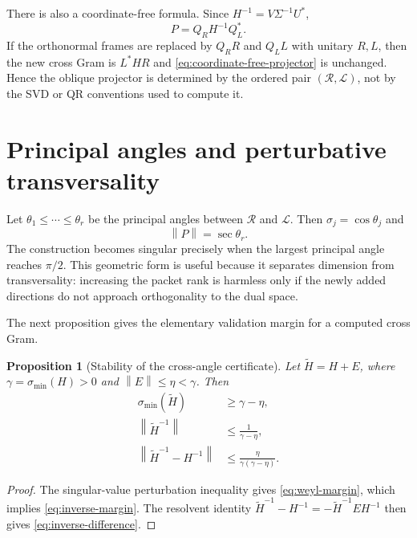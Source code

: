 \documentclass[12pt]{article}
\newtheorem{proposition}[theorem]{Proposition}
\theoremstyle{remark}
\newcommand{\cR}{\mathcal R}
\newcommand{\cL}{\mathcal L}
\newcommand{\norm}[1]{\left\lVert#1\right\rVert}
\begin{document}
There is also a coordinate-free formula.  Since
$H^{-1}=V\Sigma^{-1}U^*$,
\begin{equation}\label{eq:coordinate-free-projector}
 P=Q_RH^{-1}Q_L^*.
\end{equation}
If the orthonormal frames are replaced by
$Q_RR$ and $Q_LL$ with unitary $R,L$, then the new cross Gram is
$L^*HR$ and \eqref{eq:coordinate-free-projector} is unchanged.  Hence the
oblique projector is determined by the ordered pair $(\cR,\cL)$, not by the
SVD or QR conventions used to compute it.

\section{Principal angles and perturbative transversality}

Let $\theta_1\le\cdots\le\theta_r$ be the principal angles between
$\cR$ and $\cL$.  Then $\sigma_j=\cos\theta_j$ and
\begin{equation}\label{eq:angle-condition}
 \norm P=\sec\theta_r.
\end{equation}
The construction becomes singular precisely when the largest principal
angle reaches $\pi/2$.  This geometric form is useful because it separates
dimension from transversality: increasing the packet rank is harmless only
if the newly added directions do not approach orthogonality to the dual
space.

The next proposition gives the elementary validation margin for a computed
cross Gram.

\begin{proposition}[Stability of the cross-angle certificate]
Let $\widetilde H=H+E$, where
$\gamma=\sigma_{\min}(H)>0$ and $\norm E\le\eta<\gamma$.  Then
\begin{align}
 \sigma_{\min}(\widetilde H)&\ge\gamma-\eta,
 \label{eq:weyl-margin}\\
 \norm{\widetilde H^{-1}}&\le\frac1{\gamma-\eta},
 \label{eq:inverse-margin}\\
 \norm{\widetilde H^{-1}-H^{-1}}
 &\le\frac{\eta}{\gamma(\gamma-\eta)}.
 \label{eq:inverse-difference}
\end{align}
\end{proposition}

\begin{proof}
The singular-value perturbation inequality gives
\eqref{eq:weyl-margin}, which implies \eqref{eq:inverse-margin}.  The
resolvent identity
$\widetilde H^{-1}-H^{-1}=-\widetilde H^{-1}EH^{-1}$ then gives
\eqref{eq:inverse-difference}.
\end{proof}
\end{document}
